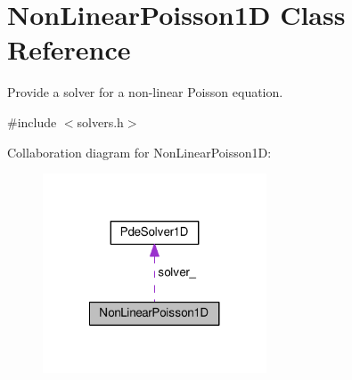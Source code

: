 \hypertarget{classNonLinearPoisson1D}{\section{Non\-Linear\-Poisson1\-D Class Reference}
\label{classNonLinearPoisson1D}
}


Provide a solver for a non-\/linear Poisson equation.  




{\ttfamily \#include $<$solvers.\-h$>$}



Collaboration diagram for Non\-Linear\-Poisson1\-D\-:\nopagebreak
\begin{figure}[H]
\begin{center}
\leavevmode
\includegraphics[width=188pt]{classNonLinearPoisson1D__coll__graph}
\end{center}
\end{figure}
